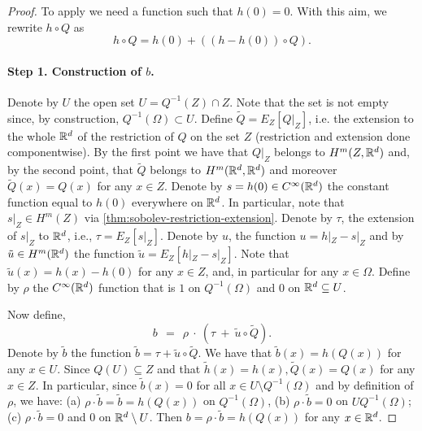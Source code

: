 \begin{proof}

To apply \citet{bourdaud2011composition} we need a function such that $h(0) = 0$. With this aim, we rewrite $h \circ Q$ as
$$h \circ Q = h(0) + ((h-h(0)) \circ Q).$$
\paragraph{Step 1. Construction of $b$.} Denote by $U$ the open set $U = Q^{-1}(Z) \cap Z$. Note that the set is not empty since, by construction, $Q^{-1}(\Omega) \subset U$.
Define $\tilde{Q} = E_{Z}[Q|_{Z}]$, i.e. the extension to the whole $\mathbb R^d$ of the restriction of $Q$ on the set $Z$ (restriction and extension done componentwise). By the first point we have that $Q|_{Z}$ belongs to $H^m(Z,\mathbb R^d)$ and, by the second point, that $\tilde{Q}$ belongs to $H^m(\mathbb R^d, \mathbb R^d)$ and moreover $\tilde{Q}(x) = Q(x)$ for any $x \in Z$.
Denote by $s = h(0) \in C^\infty(\mathbb R^d)$ the constant function equal to $h(0)$ everywhere on $\mathbb R^d$. In particular, note that $s|_Z \in H^m(Z)$ via \cref{thm:sobolev-restriction-extension}. Denote by $\tau$, the extension of $s|_Z$ to $\mathbb R^d$, i.e., $\tau = E_Z[s|_Z]$. Denote by $u$, the function $u = h|_Z - s|_Z$ and by $\tilde{u} \in H^m(\mathbb R^d)$ the function $\tilde{u} = E_{Z}[h|_Z - s|_Z]$. Note that $\tilde{u}(x) = h(x) - h(0)$ for any
$x \in Z$, and, in particular for any $x \in \Omega$. Define by $\rho$ the $C^\infty(\mathbb R^d)$ function that is $1$ on $Q^{-1}(\Omega)$ and $0$ on $\mathbb R^d \subseteq U$.

Now define,
$$b ~~=~~ \rho ~\cdot~ (\tau ~+~ \tilde{u} \circ \tilde{Q}).$$
Denote by $\tilde{b}$ the function $\tilde{b} = \tau + \tilde{u} \circ \tilde{Q}$. We have that $\tilde{b}(x) = h(Q(x))$ for any $x \in U$. Since $Q(U) \subseteq Z$ and that $\tilde{h}(x) = h(x), \tilde{Q}(x) = Q(x)$ for any $x \in Z$. In particular, since $\tilde{b}(x) = 0$ for all $x \in U \setminus Q^{-1}(\Omega)$ and by definition of $\rho$, we have: (a)  $\rho \cdot \tilde{b} = \tilde{b} = h(Q(x))$ on $Q^{-1}(\Omega)$, (b) $\rho \cdot \tilde{b} = 0$ on $U Q^{-1}(\Omega)$; (c) $\rho \cdot \tilde{b} = 0$ and $0$ on $\mathbb R^d \setminus U$. Then $b = \rho \cdot \tilde{b} = h(Q(x))$ for any $x \in \mathbb R^d$.




\end{proof}
